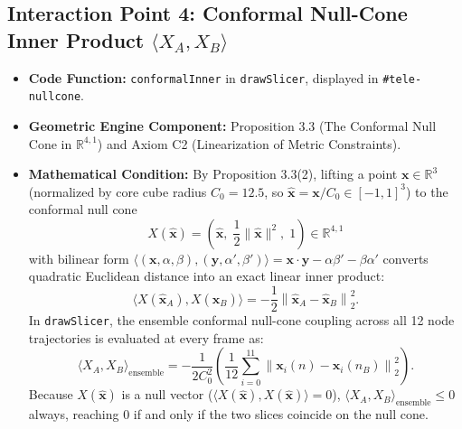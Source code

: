 \documentclass[11pt, a4paper]{article}
\begin{document}
\subsection{Interaction Point 4: Conformal Null-Cone Inner Product \texorpdfstring{$\langle X_A, X_B\rangle$}{<XA, XB>}}
\begin{itemize}
    \item \textbf{Code Function:} \texttt{conformalInner} in \texttt{drawSlicer}, displayed in \texttt{\#tele-nullcone}.
    \item \textbf{Geometric Engine Component:} Proposition 3.3 (The Conformal Null Cone in $\mathbb{R}^{4,1}$) and Axiom C2 (Linearization of Metric Constraints).
    \item \textbf{Mathematical Condition:}
    By Proposition 3.3(2), lifting a point $\mathbf{x} \in \mathbb{R}^3$ (normalized by core cube radius $C_0 = 12.5$, so $\hat{\mathbf{x}} = \mathbf{x}/C_0 \in [-1,1]^3$) to the conformal null cone
    \begin{equation}
    X(\hat{\mathbf{x}}) = \left(\hat{\mathbf{x}},\; \frac{1}{2}\|\hat{\mathbf{x}}\|^2,\; 1\right) \in \mathbb{R}^{4,1}
    \end{equation}
    with bilinear form $\langle (\mathbf{x},\alpha,\beta), (\mathbf{y},\alpha',\beta')\rangle = \mathbf{x}\cdot\mathbf{y} - \alpha\beta' - \beta\alpha'$ converts quadratic Euclidean distance into an exact linear inner product:
    \begin{equation}
    \langle X(\hat{\mathbf{x}}_A), X(\hat{\mathbf{x}}_B)\rangle = -\frac{1}{2}\left\|\hat{\mathbf{x}}_A - \hat{\mathbf{x}}_B\right\|_2^2.
    \end{equation}
    In \texttt{drawSlicer}, the ensemble conformal null-cone coupling across all 12 node trajectories is evaluated at every frame as:
    \begin{equation}
    \langle X_A, X_B\rangle_{\text{ensemble}} = -\frac{1}{2 C_0^2}\left(\frac{1}{12}\sum_{i=0}^{11} \left\|\mathbf{x}_i(n) - \mathbf{x}_i(n_B)\right\|_2^2\right).
    \end{equation}
    Because $X(\hat{\mathbf{x}})$ is a null vector ($\langle X(\hat{\mathbf{x}}), X(\hat{\mathbf{x}})\rangle = 0$), $\langle X_A, X_B\rangle_{\text{ensemble}} \le 0$ always, reaching $0$ if and only if the two slices coincide on the null cone.
\end{itemize}
\end{document}
